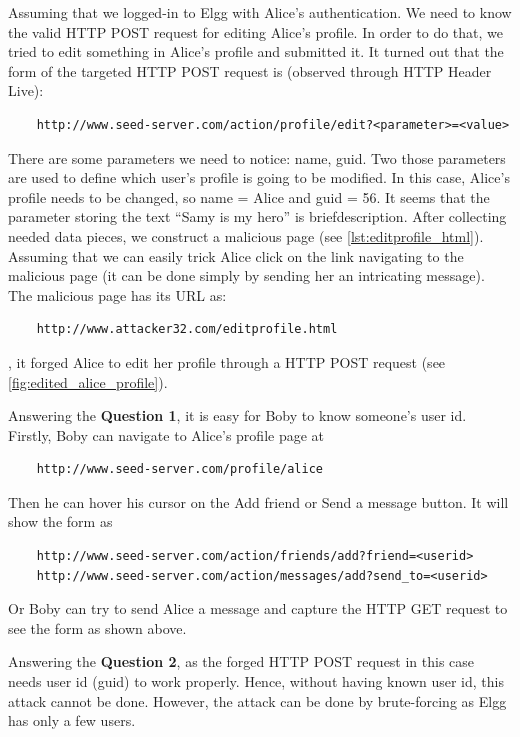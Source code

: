 Assuming that we logged-in to Elgg with Alice's authentication. We need to know the valid
HTTP POST request for editing Alice's profile. In order to do that, we tried to edit something
in Alice's profile and submitted it. It turned out that the form of the targeted HTTP POST
request is (observed through HTTP Header Live):

\begin{verbatim}
    http://www.seed-server.com/action/profile/edit?<parameter>=<value>
\end{verbatim}

There are some parameters we need to notice: {\selectfont name,
guid}. Two those parameters are used to define which user's profile is going to
be modified. In this case, Alice's profile needs to be changed, so {\selectfont
name = Alice} and {\selectfont guid = 56}. It seems that the parameter
storing the text ``Samy is my hero'' is {\selectfont briefdescription}.
After collecting needed data pieces, we construct a malicious page (see \autoref{lst:editprofile_html}).
Assuming that we can easily trick Alice click on the link navigating to the malicious page
(it can be done simply by sending her an intricating message).
The malicious page has its URL as:

\begin{verbatim}
    http://www.attacker32.com/editprofile.html
\end{verbatim}

, it forged Alice to edit her profile through a HTTP POST request (see \autoref{fig:edited_alice_profile}).

Answering the \textbf{Question 1}, it is easy for Boby to know someone's user id. Firstly,
Boby can navigate to Alice's profile page at

\begin{verbatim}
    http://www.seed-server.com/profile/alice
\end{verbatim}

Then he can hover his cursor on the {\selectfont Add friend} or
{\selectfont Send a message} button. It will show the form as

\begin{verbatim}
    http://www.seed-server.com/action/friends/add?friend=<userid>
    http://www.seed-server.com/action/messages/add?send_to=<userid>
\end{verbatim}

Or Boby can try to send Alice a message and capture the HTTP GET request to see the form
as shown above.

Answering the \textbf{Question 2}, as the forged HTTP POST request in this case needs
user id (guid) to work properly. Hence, without having known user id, this attack cannot
be done. However, the attack can be done by brute-forcing as Elgg has only a few users.